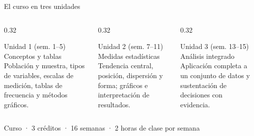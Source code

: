 \documentclass[aspectratio=169,10pt]{beamer}
\begin{document}
\begin{frame}{El curso en tres unidades}
  \begin{columns}[T,onlytextwidth]
    \begin{column}{0.32\textwidth}
      \begin{block}{Unidad 1 (sem. 1--5)}
        \small Conceptos y tablas\\[0.2em]
        Población y muestra, tipos de variables, escalas de medición, tablas de
        frecuencia y métodos gráficos.
      \end{block}
    \end{column}
    \begin{column}{0.32\textwidth}
      \begin{block}{Unidad 2 (sem. 7--11)}
        \small Medidas estadísticas\\[0.2em]
        Tendencia central, posición, dispersión y forma; gráficos e
        interpretación de resultados.
      \end{block}
    \end{column}
    \begin{column}{0.32\textwidth}
      \begin{block}{Unidad 3 (sem. 13--15)}
        \small Análisis integrado\\[0.2em]
        Aplicación completa a un conjunto de datos y sustentación de decisiones
        con evidencia.
      \end{block}
    \end{column}
  \end{columns}

  \vspace{0.45cm}
  \begin{center}
    \small Curso  · 3 créditos · 16 semanas ·
    2 horas de clase por semana
  \end{center}
\end{frame}
\end{document}
